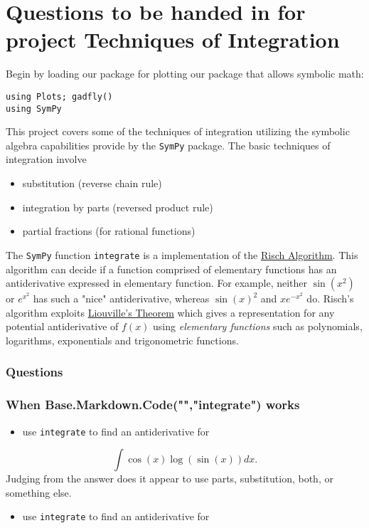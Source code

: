 \documentclass[12pt]{article}
\begin{document}
\section{Questions to be handed in for project Techniques of Integration}\newline
Begin by loading our package for plotting our package that allows symbolic math:\begin{verbatim}
using Plots; gadfly()
using SymPy
\end{verbatim}
\newline
This project covers some of the techniques of integration utilizing the symbolic algebra capabilities provide by the \texttt{SymPy} package. \newline
The basic techniques of integration involve \begin{itemize}\item substitution (reverse chain rule)\item integration by parts (reversed product rule)\item partial fractions (for rational functions)\end{itemize}\newline
The \texttt{SymPy} function \texttt{integrate} is a implementation of the \href{http://en.wikipedia.org/wiki/Risch_algorithm}{Risch Algorithm}.  This algorithm can decide if a function comprised of elementary functions has an antiderivative expressed in elementary function.  For example, neither $\sin(x^2)$ or $e^{x^2}$ has such a "nice" antiderivative, whereas $\sin(x)^2$ and $xe^{-x^2}$ do. Risch's algorithm exploits \href{http://asmeurersympy.wordpress.com/2010/08/}{Liouville's Theorem} which gives a representation for any potential antiderivative of $f(x)$ using \textit{elementary functions} such as polynomials, logarithms, exponentials and trigonometric functions.\subsubsection{Questions}\subsubsection{When Base.Markdown.Code("","integrate") works}\begin{itemize}\item use \texttt{integrate} to find an antiderivative for \end{itemize}
$$
\int \cos(x) \log(\sin(x)) dx.
$$
\newline
Judging from the answer does it appear to use parts, substitution, both, or something else.\begin{itemize}\item use \texttt{integrate} to find an antiderivative for \end{itemize}
\end{document}
